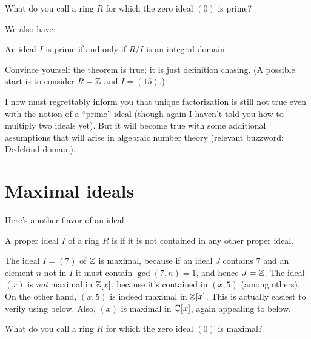 \begin{exercise}
	What do you call a ring $R$ for which the zero ideal $(0)$ is prime?
\end{exercise}

We also have:
\begin{theorem}
	\label{thm:prime_ideal_quotient}
	An ideal $I$ is prime if and only if $R/I$ is an integral domain.
\end{theorem}
\begin{exercise}
	[Mandatory]
	Convince yourself the theorem is true;
	it is just definition chasing.
	(A possible start is to consider $R = \mathbb Z$ and $I = (15)$.)
\end{exercise}

I now must regrettably inform you that unique factorization is still
not true even with the notion of a ``prime'' ideal
(though again I haven't told you how to multiply two ideals yet).
But it will become true with some additional assumptions
that will arise in algebraic number theory
(relevant buzzword: Dedekind domain).

\section{Maximal ideals}

Here's another flavor of an ideal.
\begin{definition}
	A proper ideal $I$ of a ring $R$ is  if
	it is not contained in any other proper ideal.
\end{definition}

\begin{example}
	\listhack
	\begin{enumerate}[(a)]
		\ii The ideal $I = (7)$ of $\mathbb Z$ is maximal, because
		if an ideal $J$ contains $7$
		and an element $n$ not in $I$
		it must contain $\gcd(7,n) = 1$, and hence $J = \mathbb Z$.
		\ii The ideal $(x)$ is \emph{not} maximal in $\mathbb Z[x]$,
		because it's contained in $(x,5)$ (among others).
		\ii On the other hand, $(x,5)$ is indeed maximal in $\mathbb Z[x]$.
		This is actually easiest to verify using
		 below.
		\ii Also, $(x)$ is maximal in $\mathbb C[x]$,
		again appealing to  below.
	\end{enumerate}
\end{example}

\begin{exercise}
	What do you call a ring $R$ for which the zero ideal $(0)$ is maximal?
\end{exercise}

